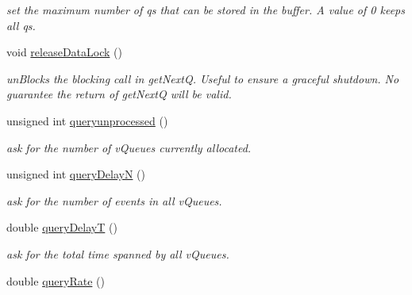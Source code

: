 \begin{DoxyCompactItemize}
\begin{DoxyCompactList}\small\item\em set the maximum number of qs that can be stored in the buffer. A value of 0 keeps all qs. \end{DoxyCompactList}\item 
void \hyperlink{classev_1_1vGenReadPort_a12f98a9e1cfa96af27dd3b5f5797a93b}{release\+Data\+Lock} ()\hypertarget{classev_1_1vGenReadPort_a12f98a9e1cfa96af27dd3b5f5797a93b}{}\label{classev_1_1vGenReadPort_a12f98a9e1cfa96af27dd3b5f5797a93b}

\begin{DoxyCompactList}\small\item\em un\+Blocks the blocking call in get\+NextQ. Useful to ensure a graceful shutdown. No guarantee the return of get\+NextQ will be valid. \end{DoxyCompactList}\item 
unsigned int \hyperlink{classev_1_1vGenReadPort_aaba8424bcf3a884e2c731fdd640149f2}{queryunprocessed} ()\hypertarget{classev_1_1vGenReadPort_aaba8424bcf3a884e2c731fdd640149f2}{}\label{classev_1_1vGenReadPort_aaba8424bcf3a884e2c731fdd640149f2}

\begin{DoxyCompactList}\small\item\em ask for the number of v\+Queues currently allocated. \end{DoxyCompactList}\item 
unsigned int \hyperlink{classev_1_1vGenReadPort_a5e83311979ffea1ab0059e493e3354d4}{query\+DelayN} ()\hypertarget{classev_1_1vGenReadPort_a5e83311979ffea1ab0059e493e3354d4}{}\label{classev_1_1vGenReadPort_a5e83311979ffea1ab0059e493e3354d4}

\begin{DoxyCompactList}\small\item\em ask for the number of events in all v\+Queues. \end{DoxyCompactList}\item 
double \hyperlink{classev_1_1vGenReadPort_a9c7d57b9a846edf5c699758e78120456}{query\+DelayT} ()\hypertarget{classev_1_1vGenReadPort_a9c7d57b9a846edf5c699758e78120456}{}\label{classev_1_1vGenReadPort_a9c7d57b9a846edf5c699758e78120456}

\begin{DoxyCompactList}\small\item\em ask for the total time spanned by all v\+Queues. \end{DoxyCompactList}\item 
double \hyperlink{classev_1_1vGenReadPort_a45043df88f628713844cce223518bd49}{query\+Rate} ()\hypertarget{classev_1_1vGenReadPort_a45043df88f628713844cce223518bd49}{}\label{classev_1_1vGenReadPort_a45043df88f628713844cce223518bd49}


\end{DoxyCompactItemize}
